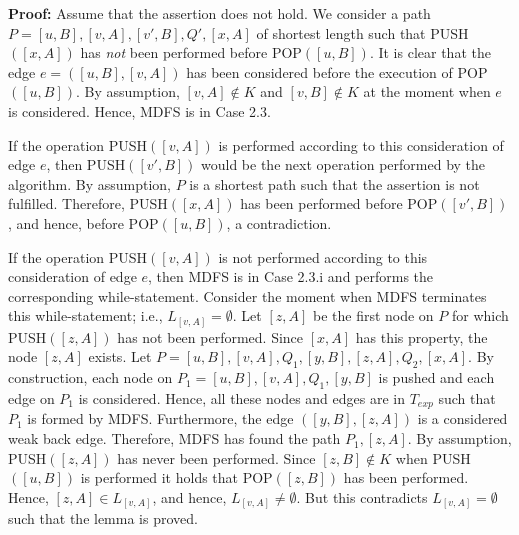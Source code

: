 \documentclass[12pt,twoside,a4paper]{article}
\def\QED{\hbox{\hskip 1pt \vrule width4pt height 6pt depth 1.5pt \hskip 1pt}}
\begin{document}
\medskip
\noindent 
{\bf Proof:}
Assume that the assertion does not hold. We consider a path
$P = [u,B],[v,A],[v',B],Q',[x,A]$ of shortest length such that 
PUSH$([x,A])$ has {\em not\/} been performed before POP$([u,B])$.
It is clear that the edge $e = ([u,B],[v,A])$ has been considered before the 
execution of POP$([u,B])$. By assumption, $[v,A] \not\in K$ and $[v,B] \not\in K$
at the moment when $e$ is considered. Hence, MDFS is in Case 2.3.

If the operation PUSH$([v,A])$ is performed according to this consideration of 
edge $e$, then PUSH$([v',B])$ would be the next operation performed by the
algorithm. By assumption, $P$ is a shortest path such that the assertion
is not fulfilled. Therefore, PUSH$([x,A])$ has been performed before POP$([v',B])$, 
and hence, before POP$([u,B])$, a contradiction. 

If the operation PUSH$([v,A])$ is not performed 
according to this consideration of edge $e$, then MDFS is in Case 2.3.i and performs 
the corresponding while-statement. Consider the moment when MDFS terminates this 
while-statement; i.e., $L_{[v,A]} = \emptyset$.
Let $[z,A]$ be the first node on $P$ for which PUSH$([z,A])$ has not been
performed. Since $[x,A]$ has this property, the node $[z,A]$ exists.
Let $P = [u,B],[v,A],Q_1,[y,B],[z,A],Q_2,[x,A]$. By construction, each node on
$P_1 = [u,B],[v,A],Q_1,[y,B]$ is pushed and each edge on $P_1$ is considered.
Hence, all these nodes and edges are in $T_{exp}$ such that $P_1$ is formed by MDFS.
Furthermore, the edge $([y,B],[z,A])$ is a considered weak back edge. Therefore,
MDFS has found the path $P_1,[z,A]$. By assumption, PUSH$([z,A])$ has never been 
performed. Since $[z,B] \not\in K$ when PUSH$([u,B])$ is performed it holds that
POP$([z,B])$ has been performed.
Hence, $[z,A] \in L_{[v,A]}$, and hence, $L_{[v,A]} \not= \emptyset$. But this 
contradicts $L_{[v,A]} = \emptyset$ such that the lemma is proved.
\QED
\end{document}
